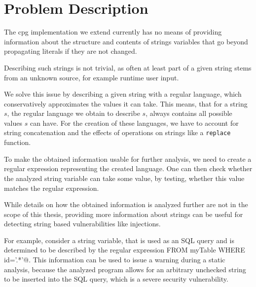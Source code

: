 \chapter{Problem Description}
\label{chapter:ProblemDescription}

The \ac{cpg} implementation we extend currently has no means of providing information about the structure and contents of strings variables that go beyond propagating literals if they are not changed.

Describing such strings is not trivial, as often at least part of a given string stems from an unknown source, for example runtime user input.

We solve this issue by describing a given string with a regular language, which conservatively approximates the values it can take.
This means, that for a string $s$, the regular language we obtain to describe $s$, always contains all possible values $s$ can have.
For the creation of these languages, we have to account for string concatenation and the effects of operations on strings like a \lstinline|replace| function.

To make the obtained information usable for further analysis, we need to create a regular expression representing the created language. One can then check whether the analyzed string variable can take some value, by testing, whether this value matches the regular expression.

While details on how the obtained information is analyzed further are not in the scope of this thesis, providing more information about strings can be useful for detecting string based vulnerabilities like injections.

For example, consider a string variable, that is used as an SQL query and is determined to be described by the regular expression \Verb@DELETE \* FROM myTable WHERE id='.*'@.
This information can be used to issue a warning during a static analysis, because the analyzed program allows for an arbitrary unchecked string to be inserted into the SQL query, which is a severe security vulnerability.

\begin{comment}
	
The introduction is a bit like a teaser. Here, you dig more into details, also
technical ones. After this chapter, the reader must understand why you do this
work, why it's important, what makes it difficult and what you want to achieve.

\begin{itemize}
\item What's the problem that you're trying to solve?
\item What is your goal?
\item What is/are the research question(s)?
\item What are special problems?
\end{itemize}

Probably 1-3 pages

\end{comment}
